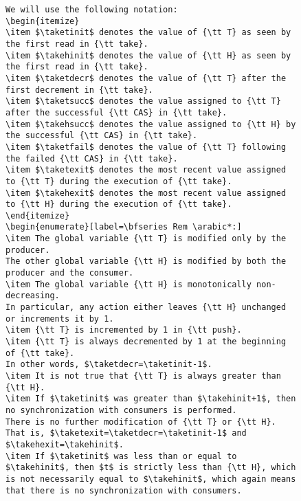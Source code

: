 \documentclass[a4paper]{article}
\begin{document}
{\begin{figure}
\begin{lstlisting}
We will use the following notation:
\begin{itemize}
\item $\taketinit$ denotes the value of {\tt T} as seen by the first read in {\tt take}.
\item $\takehinit$ denotes the value of {\tt H} as seen by the first read in {\tt take}.
\item $\taketdecr$ denotes the value of {\tt T} after the first decrement in {\tt take}.
\item $\taketsucc$ denotes the value assigned to {\tt T} after the successful {\tt CAS} in {\tt take}.
\item $\takehsucc$ denotes the value assigned to {\tt H} by the successful {\tt CAS} in {\tt take}.
\item $\taketfail$ denotes the value of {\tt T} following the failed {\tt CAS} in {\tt take}.
\item $\taketexit$ denotes the most recent value assigned to {\tt T} during the execution of {\tt take}.
\item $\takehexit$ denotes the most recent value assigned to {\tt H} during the execution of {\tt take}.
\end{itemize}
\begin{enumerate}[label=\bfseries Rem \arabic*:]
\item The global variable {\tt T} is modified only by the producer. 
The other global variable {\tt H} is modified by both the producer and the consumer.
\item The global variable {\tt H} is monotonically non-decreasing. 
In particular, any action either leaves {\tt H} unchanged or increments it by 1.
\item {\tt T} is incremented by 1 in {\tt push}.
\item {\tt T} is always decremented by 1 at the beginning of {\tt take}.
In other words, $\taketdecr=\taketinit-1$.
\item It is not true that {\tt T} is always greater than {\tt H}. 
\item If $\taketinit$ was greater than $\takehinit+1$, then no synchronization with consumers is performed.
There is no further modification of {\tt T} or {\tt H}.
That is, $\taketexit=\taketdecr=\taketinit-1$ and $\takehexit=\takehinit$.
\item If $\taketinit$ was less than or equal to $\takehinit$, then $t$ is strictly less than {\tt H}, which is not necessarily equal to $\takehinit$, which again means that there is no synchronization with consumers.

\end{lstlisting}
\end{figure}}
\end{document}

